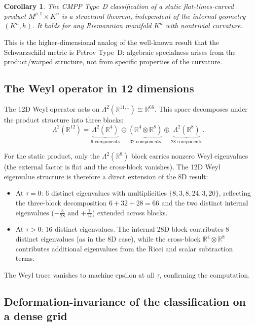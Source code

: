 \documentclass[12pt]{article}
\newtheorem{corollary}[theorem]{Corollary}
\theoremstyle{definition}
\theoremstyle{remark}
\begin{document}
\begin{corollary}
\label{cor:structural}
The CMPP Type~D classification of a static flat-times-curved product $M^{p,1}\times K^n$ is a structural theorem, independent of the internal geometry $(K^n,h)$.  It holds for \emph{any} Riemannian manifold $K^n$ with nontrivial curvature.
\end{corollary}

This is the higher-dimensional analog of the well-known result that the Schwarzschild metric is Petrov Type~D: algebraic specialness arises from the product/warped structure, not from specific properties of the curvature.

\subsection{The Weyl operator in 12 dimensions}

The 12D Weyl operator acts on $\Lambda^2(\mathbb{R}^{11,1})\cong\mathbb{R}^{66}$.  This space decomposes under the product structure into three blocks:
\begin{equation}
\Lambda^2(\mathbb{R}^{12}) = \underbrace{\Lambda^2(\mathbb{R}^4)}_{\text{6 components}} \oplus \underbrace{(\mathbb{R}^4\otimes\mathbb{R}^8)}_{\text{32 components}} \oplus \underbrace{\Lambda^2(\mathbb{R}^8)}_{\text{28 components}}.
\end{equation}

For the static product, only the $\Lambda^2(\mathbb{R}^8)$ block carries nonzero Weyl eigenvalues (the external factor is flat and the cross-block vanishes).  The 12D Weyl eigenvalue structure is therefore a direct extension of the 8D result:
\begin{itemize}
    \item At $\tau=0$: 6 distinct eigenvalues with multiplicities $\{8,3,8,24,3,20\}$, reflecting the three-block decomposition $6+32+28=66$ and the two distinct internal eigenvalues ($-\tfrac{5}{28}$ and $+\tfrac{1}{14}$) extended across blocks.
    \item At $\tau>0$: 16 distinct eigenvalues.  The internal 28D block contributes 8 distinct eigenvalues (as in the 8D case), while the cross-block $\mathbb{R}^4\otimes\mathbb{R}^8$ contributes additional eigenvalues from the Ricci and scalar subtraction terms.
\end{itemize}
The Weyl trace vanishes to machine epsilon at all $\tau$, confirming the computation.

\subsection{Deformation-invariance of the classification on a dense grid}
\label{subsec:dense}
\end{document}
